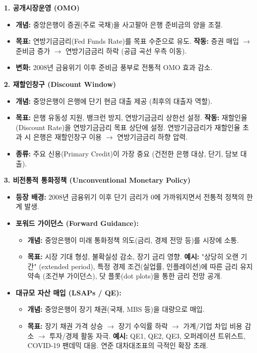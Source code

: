 \documentclass[11pt,a4paper]{article}
\theoremstyle{definition}
\begin{document}
\begin{tcolorbox}[summarybox, title=\textbf{중앙은행 통화정책 도구 요약}]
  \textbf{1. 공개시장운영 (OMO)}
  \begin{itemize}
    \item \textbf{개념:} 중앙은행이 증권(주로 국채)을 사고팔아 은행 준비금의 양을 조절.
    \item \textbf{목표:} 연방기금금리(Fed Funds Rate)를 목표 수준으로 유도.
    \textbf{작동:} 증권 매입 $\rightarrow$ 준비금 증가 $\rightarrow$ 연방기금금리 하락 (공급 곡선 우측 이동).
    \item \textbf{변화:} 2008년 금융위기 이후 준비금 풍부로 전통적 OMO 효과 감소.
  \end{itemize}

  \textbf{2. 재할인창구 (Discount Window)}
  \begin{itemize}
    \item \textbf{개념:} 중앙은행이 은행에 단기 현금 대출 제공 (최후의 대출자 역할).
    \item \textbf{목표:} 은행 유동성 지원, 뱅크런 방지, 연방기금금리 상한선 설정.
    \textbf{작동:} 재할인율(Discount Rate)을 연방기금금리 목표 상단에 설정. 연방기금금리가 재할인율 초과 시 은행은 재할인창구 이용 $\rightarrow$ 연방기금금리 하향 압력.
    \item \textbf{종류:} 주요 신용(Primary Credit)이 가장 중요 (건전한 은행 대상, 단기, 담보 대출).
  \end{itemize}

  \textbf{3. 비전통적 통화정책 (Unconventional Monetary Policy)}
  \begin{itemize}
    \item \textbf{등장 배경:} 2008년 금융위기 이후 단기 금리가 0에 가까워지면서 전통적 정책의 한계 발생.
    \item \textbf{포워드 가이던스 (Forward Guidance):}
      \begin{itemize}
        \item \textbf{개념:} 중앙은행이 미래 통화정책 의도(금리, 경제 전망 등)를 시장에 소통.
        \item \textbf{목표:} 시장 기대 형성, 불확실성 감소, 장기 금리 영향.
        \textbf{예시:} "상당히 오랜 기간" (extended period), 특정 경제 조건(실업률, 인플레이션)에 따른 금리 유지 약속 (조건부 가이던스), 닷 플롯(dot plots)을 통한 금리 전망 공개.
      \end{itemize}
    \item \textbf{대규모 자산 매입 (LSAPs / QE):}
      \begin{itemize}
        \item \textbf{개념:} 중앙은행이 장기 채권(국채, MBS 등)을 대량으로 매입.
        \item \textbf{목표:} 장기 채권 가격 상승 $\rightarrow$ 장기 수익률 하락 $\rightarrow$ 가계/기업 차입 비용 감소 $\rightarrow$ 투자/경제 활동 자극.
        \textbf{예시:} QE1, QE2, QE3, 오퍼레이션 트위스트, COVID-19 팬데믹 대응. 연준 대차대조표의 극적인 확장 초래.
      \end{itemize}
  \end{itemize}


\end{tcolorbox}
\end{document}

